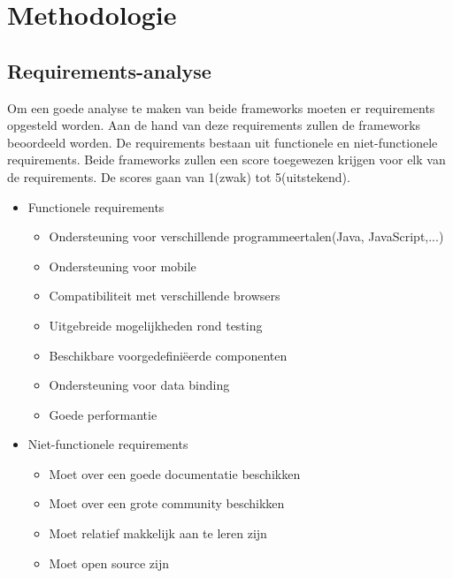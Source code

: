 
\chapter{Methodologie}
\label{ch:methodologie}


\section{Requirements-analyse}
Om een goede analyse te maken van beide frameworks moeten er requirements opgesteld worden. Aan de hand van deze requirements zullen de frameworks beoordeeld worden. De requirements bestaan uit functionele en niet-functionele requirements. Beide frameworks zullen een score toegewezen krijgen voor elk van de requirements. De scores gaan van 1(zwak) tot 5(uitstekend).

\begin{itemize}
\item  Functionele requirements 
\begin{itemize}
	\item Ondersteuning voor verschillende programmeertalen(Java, JavaScript,...)
	\item Ondersteuning voor mobile
	\item Compatibiliteit met verschillende browsers
	\item Uitgebreide mogelijkheden rond testing
	\item Beschikbare voorgedefiniëerde componenten 
	\item Ondersteuning voor data binding
	\item Goede performantie
\end{itemize}

\item Niet-functionele requirements
\begin{itemize}
	\item Moet over een goede documentatie beschikken
	\item Moet over een grote community beschikken
	\item Moet relatief makkelijk aan te leren zijn 
	\item Moet open source zijn	
\end{itemize}
\end{itemize}

